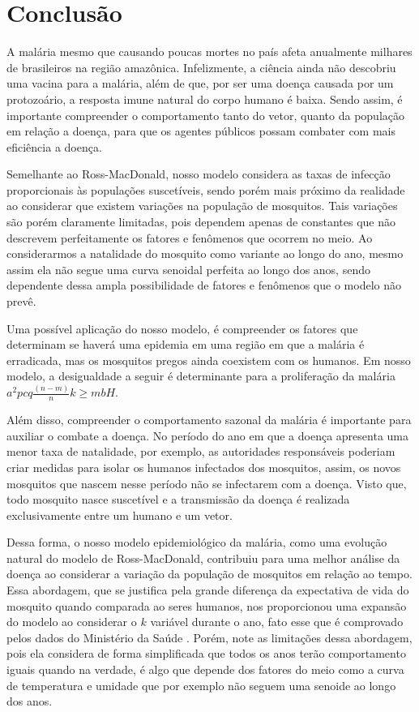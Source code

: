\documentclass[
	12pt,				%
	openright,			%
	twoside,			%
	a4paper,			%
	english,			%
	french,				%
	spanish,			%
	brazil				%
	]{abntex2}
\begin{document}
\chapter*[Conclusão]{Conclusão}

A malária mesmo que causando poucas mortes no país afeta anualmente milhares de brasileiros na região amazônica. Infelizmente, a ciência ainda não descobriu uma vacina para a malária, além de que, por ser uma doença causada por um protozoário, a resposta imune natural do corpo humano é baixa. Sendo assim, é importante compreender o comportamento tanto do vetor, quanto da população em relação a doença, para que os agentes públicos possam combater com mais eficiência a doença.


Semelhante ao Ross-MacDonald, nosso modelo considera as taxas de infecção proporcionais às populações suscetíveis, sendo porém mais próximo da realidade ao considerar que existem variações na população de mosquitos. Tais variações são porém claramente limitadas, pois dependem apenas de constantes que não descrevem perfeitamente os fatores e fenômenos que ocorrem no meio. Ao considerarmos a natalidade do mosquito como variante ao longo do ano, mesmo assim ela não segue uma curva senoidal perfeita ao longo dos anos, sendo dependente dessa ampla possibilidade de fatores e fenômenos que o modelo não prevê. 

Uma possível aplicação do nosso modelo, é compreender os fatores que determinam se haverá uma epidemia em uma região em que a malária é erradicada, mas os mosquitos pregos ainda coexistem com os humanos. Em nosso modelo, a desigualdade a seguir é determinante para a proliferação da malária $a^2p cq\frac{(n-m)}{n}k\ge mbH$.


Além disso, compreender o comportamento sazonal da malária é importante para auxiliar o combate a doença. No período do ano em que a doença apresenta uma menor taxa de natalidade, por exemplo, as autoridades responsáveis poderiam criar medidas para isolar os humanos infectados dos mosquitos, assim, os novos mosquitos que nascem nesse período não se infectarem com a doença. Visto que, todo mosquito nasce suscetível e a transmissão da doença é realizada exclusivamente entre um humano e um vetor.


Dessa forma, o nosso modelo epidemiológico da malária, como uma evolução natural do modelo de Ross-MacDonald, contribuiu para uma melhor análise da doença ao considerar a variação da população de mosquitos em relação ao tempo. Essa abordagem, que se justifica pela grande diferença da expectativa de vida do mosquito quando comparada ao seres humanos, nos proporcionou uma expansão do modelo ao considerar o $k$ variável durante o ano, fato esse que é comprovado pelos dados do Ministério da Saúde \cite{boletim}. Porém, note as limitações dessa abordagem, pois ela considera de forma simplificada que todos os anos terão comportamento iguais quando na verdade, é algo que depende dos fatores do meio como a curva de temperatura e umidade que por exemplo não seguem uma senoide ao longo dos anos. 
\end{document}
